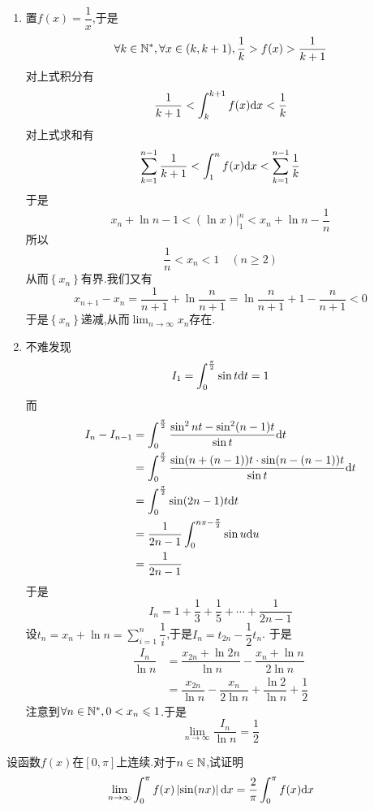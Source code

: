 \documentclass{ctexart}
\begin{document}
\begin{solution}
    \begin{enumerate}[label=\textbf{(\arabic*)}]
        \item 置$f(x)=\dfrac{1}{x}$,于是$$\forall k\in\mathbb{N}^*,\forall x\in(k,k+1),\dfrac{1}{k}>f(x)>\dfrac{1}{k+1}$$
            对上式积分有$$\dfrac{1}{k+1}<\int_{k}^{k+1}f(x)\mathrm{d} x<\dfrac{1}{k}$$
            对上式求和有$$\sum_{k=1}^{n-1}\dfrac{1}{k+1}<\int_1^nf(x)\mathrm{d} x<\sum_{k=1}^{n-1}\dfrac{1}{k}$$
            于是$$x_n+\ln n-1<\left.(\ln x)\right|_1^n<x_n+\ln n-\dfrac{1}{n}$$
            所以$$\dfrac{1}{n}<x_n<1\quad(n\geqslant2)$$
            从而$\left\{x_n\right\}$有界.我们又有
            $$x_{n+1}-x_n=\dfrac{1}{n+1}+\ln\dfrac{n}{n+1}=\ln\dfrac{n}{n+1}+1-\dfrac{n}{n+1}<0$$
            于是$\left\{x_n\right\}$递减,从而$\displaystyle\lim_{n\to\infty}x_n$存在.
        \item 不难发现$$I_1=\int_0^{\frac{\pi}{2}}\sin t\mathrm{d} t=1$$
            而
            $$\begin{aligned}
                I_n-I_{n-1}
                &= \int_0^{\frac{\pi}{2}}\dfrac{\sin^2nt-\sin^2(n-1)t}{\sin t}\mathrm{d} t \\
                &= \int_0^{\frac{\pi}{2}}\dfrac{\sin(n+(n-1))t\cdot\sin(n-(n-1))t}{\sin t}\mathrm{d} t \\
                &= \int_0^{\frac{\pi}{2}}\sin(2n-1)t\mathrm{d} t \\
                &= \dfrac{1}{2n-1}\int_0^{n\pi-\frac{\pi}{2}}\sin u\mathrm{d} u \\
                &= \dfrac{1}{2n-1}
            \end{aligned}$$
            于是$$I_n=1+\dfrac{1}{3}+\dfrac{1}{5}+\cdots+\dfrac{1}{2n-1}$$
            设$\displaystyle t_n=x_n+\ln n=\sum_{i=1}^n\dfrac{1}{i}$,于是$I_n=t_{2n}-\dfrac{1}{2}t_n$.
            于是$$\begin{aligned}
                \dfrac{I_n}{\ln n}
                &= \dfrac{x_{2n}+\ln2n}{\ln n}-\dfrac{x_n+\ln n}{2\ln n} \\
                &= \dfrac{x_{2n}}{\ln n}-\dfrac{x_n}{2\ln n}+\dfrac{\ln 2}{\ln n}+\dfrac{1}{2}
            \end{aligned}$$
            注意到$\forall n\in\mathbb{N}^*,0<x_n\leqslant1$.于是$$\lim_{n\to\infty}\dfrac{I_n}{\ln n}=\dfrac{1}{2}$$
    \end{enumerate}
\end{solution}
\begin{problem}[8.(15\songti{分})]
    设函数$f(x)$在$[0,\pi]$上连续.对于$n\in\mathbb{N}$,试证明$$\lim_{n\to\infty}\int_{0}^{\pi}f(x)\left|\sin(nx)\right|\mathrm{d} x=\dfrac{2}{\pi}\int_0^\pi f(x)\mathrm{d} x$$
\end{problem}
\end{document}
